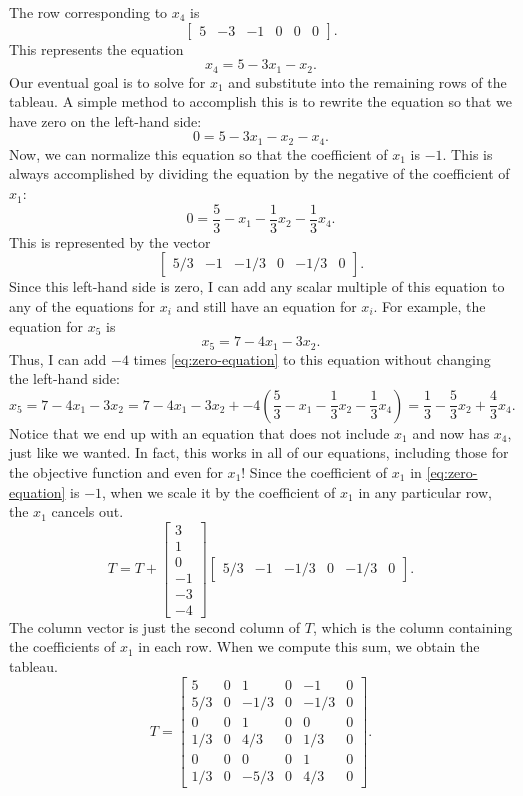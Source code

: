 The row corresponding to $x_4$ is
\[
\begin{bmatrix} 5 &-3 &-1 & 0 & 0 & 0\end{bmatrix}.
\]
This represents the equation
\[
x_4 = 5 - 3x_1 - x_2.
\]
Our eventual goal is to solve for $x_1$ and substitute into the remaining rows of the tableau.
A simple method to accomplish this is to rewrite the equation so that we have zero on the left-hand side:
\[
0 = 5 - 3x_1 - x_2 - x_4.
\]
Now, we can normalize this equation so that the coefficient of $x_1$ is $-1$.
This is always accomplished by dividing the equation by the negative of the coefficient of $x_1$:
\begin{equation}
0 = \frac{5}{3} - x_1 - \frac{1}{3}x_2 - \frac{1}{3}x_4.
\label{eq:zero-equation}
\end{equation}
This is represented by the vector
\[
\begin{bmatrix} 5/3 & -1 & -1/3 & 0 & -1/3 & 0\end{bmatrix}.
\]
Since this left-hand side is zero, I can add any scalar multiple of this equation to any of the equations for $x_i$ and still have an equation for $x_i$.
For example, the equation for $x_5$ is
\[
x_5 = 7 - 4x_1 - 3x_2.
\]
Thus, I can add $-4$ times \eqref{eq:zero-equation} to this equation without changing the left-hand side:
\[ x_5 = 7 - 4x_1 - 3x_2 = 7 - 4x_1 - 3x_2 + -4\left(\frac{5}{3} - x_1 - \frac{1}{3}x_2 - \frac{1}{3}x_4\right) = \frac{1}{3} - \frac{5}{3}x_2 + \frac{4}{3} x_4.
\]
Notice that we end up with an equation that does not include $x_1$ and now has $x_4$, just like we wanted.
In fact, this works in all of our equations, including those for the objective function and even for $x_1$!
Since the coefficient of $x_1$ in \eqref{eq:zero-equation} is $-1$, when we scale it by the coefficient of $x_1$ in any particular row, the $x_1$ cancels out.
\[
T = T + \begin{bmatrix}3 \\ 1 \\ 0 \\ -1 \\ -3 \\ -4\end{bmatrix}\begin{bmatrix} 5/3 & -1 & -1/3 & 0 & -1/3 & 0\end{bmatrix}.
\]
The column vector is just the second column of $T$, which is the column containing the coefficients of $x_1$ in each row.
When we compute this sum, we obtain the tableau.
\[
T = \begin{bmatrix}
        5 &  0 & 1 & 0 & -1 & 0 \\
        5/3 & 0 &-1/3 & 0 &-1/3 & 0 \\
        0 & 0 & 1 & 0 & 0 & 0 \\
        1/3 & 0 & 4/3 & 0 & 1/3 & 0 \\
        0 & 0 & 0 & 0 & 1 & 0 \\
        1/3 & 0 & -5/3 & 0 & 4/3 & 0
\end{bmatrix}.
\]

